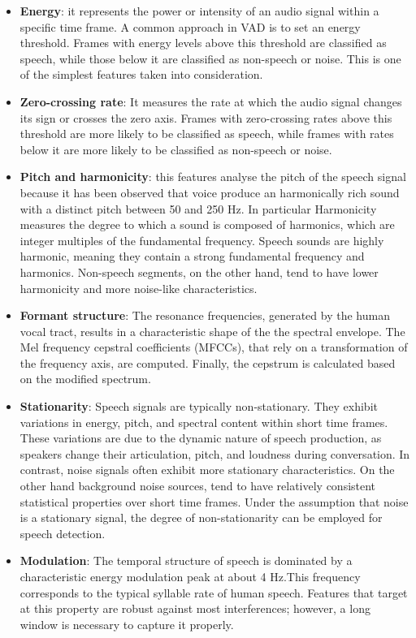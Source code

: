 \documentclass[../main.tex]{subfiles}
\begin{document}
\begin{itemize}
    \item \textbf{Energy}: it represents the power or intensity of an audio signal within a specific time frame. A common approach in VAD is to set an energy threshold. Frames with energy levels above this threshold are classified as speech, while those below it are classified as non-speech or noise. This is one of the simplest features taken into consideration. 

    \item \textbf{Zero-crossing rate}: It measures the rate at which the audio signal changes its sign or crosses the zero axis. Frames with zero-crossing rates above this threshold are more likely to be classified as speech, while frames with rates below it are more likely to be classified as non-speech or noise.  

    \item \textbf{Pitch and harmonicity}: this features analyse the pitch of the speech signal because it has been observed that voice produce an harmonically rich sound with a distinct pitch between 50 and 250 Hz. In particular Harmonicity measures the degree to which a sound is composed of harmonics, which are integer multiples of the fundamental frequency. Speech sounds are highly harmonic, meaning they contain a strong fundamental frequency and harmonics. Non-speech segments, on the other hand, tend to have lower harmonicity and more noise-like characteristics.

    \item \textbf{Formant structure}: The resonance frequencies, generated by the human vocal tract, results in a characteristic shape of the the spectral envelope. The Mel frequency cepstral coefficients (MFCCs), that rely on a transformation of the frequency axis, are computed. Finally, the cepstrum is calculated based on the modified spectrum.

    \item \textbf{Stationarity}: Speech signals are typically non-stationary. They exhibit variations in energy, pitch, and spectral content within short time frames. These variations are due to the dynamic nature of speech production, as speakers change their articulation, pitch, and loudness during conversation. In contrast, noise signals often exhibit more stationary characteristics. On the other hand background noise sources, tend to have relatively consistent statistical properties over short time frames. Under the assumption that noise is a stationary signal, the degree of non-stationarity can be employed for speech detection.

    \item \textbf{Modulation}: The temporal structure of speech is dominated by a characteristic
    energy modulation peak at about 4 Hz.This frequency corresponds to the typical syllable rate of human speech. Features that target at this property are robust against most interferences; however, a long window is necessary to capture it properly.

\end{itemize}
\end{document}

